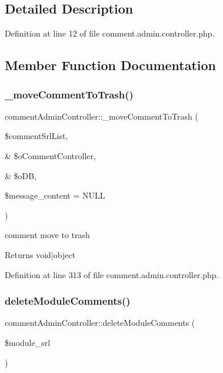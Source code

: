 \subsection{Detailed Description}


Definition at line 12 of file comment.\+admin.\+controller.\+php.



\subsection{Member Function Documentation}
\mbox{\label{classcommentAdminController_a2ac42957d98a26a13576e174ec5fc4e6}} 
\subsubsection{\texorpdfstring{\+\_\+move\+Comment\+To\+Trash()}{\_moveCommentToTrash()}}
{\footnotesize\ttfamily comment\+Admin\+Controller\+::\+\_\+move\+Comment\+To\+Trash (\begin{DoxyParamCaption}\item[{}]{\$comment\+Srl\+List,  }\item[{\&}]{\$o\+Comment\+Controller,  }\item[{\&}]{\$o\+DB,  }\item[{}]{\$message\+\_\+content = {\ttfamily NULL} }\end{DoxyParamCaption})}

comment move to trash \begin{DoxyReturn}{Returns}
void$\vert$object 
\end{DoxyReturn}


Definition at line 313 of file comment.\+admin.\+controller.\+php.

\mbox{\label{classcommentAdminController_a72c265be53cc3b664cd0702a568bc05f}} 
\subsubsection{\texorpdfstring{delete\+Module\+Comments()}{deleteModuleComments()}}
{\footnotesize\ttfamily comment\+Admin\+Controller\+::delete\+Module\+Comments (\begin{DoxyParamCaption}\item[{}]{\$module\+\_\+srl }\end{DoxyParamCaption})}

